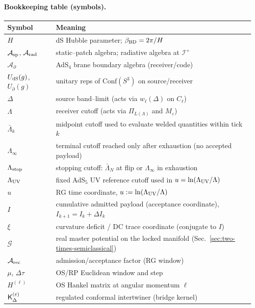 \documentclass[10pt]{article}
\theoremstyle{definition}
\theoremstyle{plain}
\begin{document}
\paragraph{Bookkeeping table (symbols).}\label{par:uom-main-015}
\begin{center}
\begin{tabular}{@{}ll@{}}
\toprule
Symbol & Meaning \\
\midrule
$H$ & dS Hubble parameter; $\beta_{\rm BD}=2\pi/H$ \\
$\mathcal A_{\rm sp}$, $\mathcal A_{\rm rad}$ & static–patch algebra; radiative algebra at $\mathscr I^+$ \\
$\mathcal A_\partial$ & AdS$_4$ brane boundary algebra (receiver/code) \\
$U_{\rm dS}(g)$, $U_\partial(g)$ & unitary reps of $\mathrm{Conf}(S^3)$ on source/receiver \\
$\Delta$ & source band–limit (acts via $w_\ell(\Delta)$ on $C_\ell$) \\
$\Lambda$ & receiver cutoff (acts via $\Pi_{L(\Lambda)}$ and $M_\varepsilon$) \\
$\bar\Lambda_k$ & midpoint cutoff used to evaluate welded quantities within tick $k$ \\
$\Lambda_\infty$ & terminal cutoff reached only after exhaustion (no accepted payload) \\
$\Lambda_{\rm stop}$ & stopping cutoff: $\bar\Lambda_N$ at flip or $\Lambda_\infty$ in exhaustion \\
$\Lambda_{\rm UV}$ & fixed AdS$_5$ UV reference cutoff used in $u=\ln(\Lambda_{\rm UV}/\Lambda)$ \\
$u$ & RG time coordinate, $u:=\ln(\Lambda_{\rm UV}/\Lambda)$ \\
$I$ & cumulative admitted payload (acceptance coordinate), $I_{k+1}=I_k+\Delta I_k$ \\
$\xi$ & curvature deficit / DC trace coordinate (conjugate to $I$) \\
$\mathcal G$ & real master potential on the locked manifold (Sec.~\ref{sec:two-times-semiclassical}) \\
$\mathcal A_{\rm rec}$ & admission/acceptance factor (RG window) \\
$\mu$, $\Delta\tau$ & OS/RP Euclidean window and step \\
$H^{(\ell)}$ & OS Hankel matrix at angular momentum $\ell$ \\
${\sf K}_\Delta^{(\varepsilon)}$ & regulated conformal intertwiner (bridge kernel) \\

\end{tabular}
\end{center}
\end{document}

